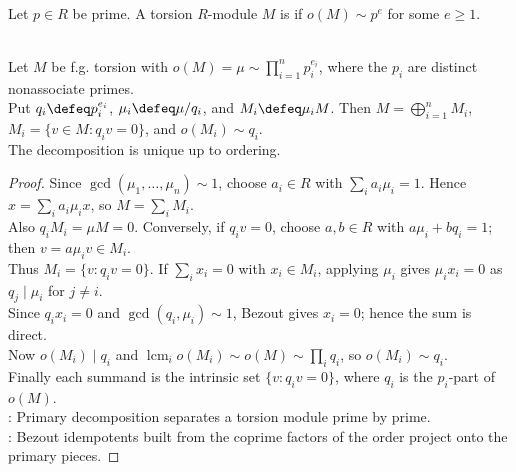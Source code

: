 \begin{definition} \label{def:primary-module-over-pid} \\
Let $p\in R$ be prime. A torsion $R$-module $M$ is  if $o(M)\sim p^e$ for some $e\geq1$.
\end{definition}

\begin{theorem} \label{thm:primary-decomposition-pid-modules} \\
Let $M$ be f.g. torsion with $o(M)=\mu\sim\prod\limits_{i=1}^n p_i^{e_i}$, where the $p_i$ are distinct nonassociate primes.\\
Put $q_i\defeq p_i^{e_i}$, $\mu_i\defeq\mu/q_i$, and $M_i\defeq\mu_iM$. Then $M=\bigoplus\limits_{i=1}^nM_i$, $M_i=\{v\in M:q_iv=0\}$, and $o(M_i)\sim q_i$.\\
The decomposition is unique up to ordering.
\begin{proof}
Since $\gcd(\mu_1,\ldots,\mu_n)\sim1$, choose $a_i\in R$ with $\sum\limits_i a_i\mu_i=1$. Hence $x=\sum\limits_i a_i\mu_ix$, so $M=\sum_iM_i$.\\
Also $q_iM_i=\mu M=0$. Conversely, if $q_iv=0$, choose $a,b\in R$ with $a\mu_i+bq_i=1$; then $v=a\mu_iv\in M_i$.\\
Thus $M_i=\{v:q_iv=0\}$. If $\sum_i x_i=0$ with $x_i\in M_i$, applying $\mu_i$ gives $\mu_ix_i=0$ as $q_j\mid\mu_i$ for $j\neq i$.\\
Since $q_ix_i=0$ and $\gcd(q_i,\mu_i)\sim1$, Bezout gives $x_i=0$; hence the sum is direct.\\
Now $o(M_i)\mid q_i$ and $\operatorname{lcm}_i o(M_i)\sim o(M)\sim\prod_iq_i$, so $o(M_i)\sim q_i$.\\
Finally each summand is the intrinsic set $\{v:q_iv=0\}$, where $q_i$ is the $p_i$-part of $o(M)$.\\
: Primary decomposition separates a torsion module prime by prime.\\
: Bezout idempotents built from the coprime factors of the order project onto the primary pieces.
\end{proof}
\end{theorem}

